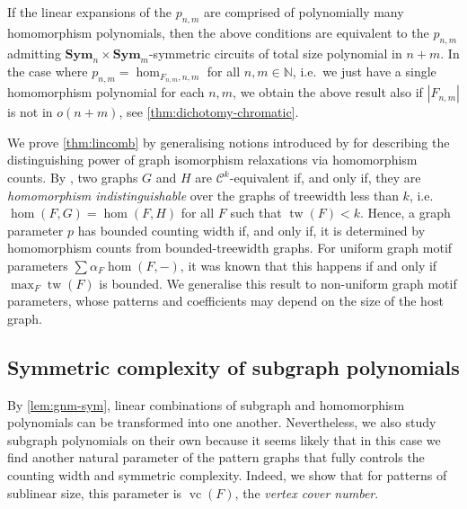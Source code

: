 \documentclass[10pt,a4paper]{article}
\theoremstyle{definition}
\theoremstyle{plain}
\theoremstyle{remark}
\DeclareMathOperator{\tw}{tw}
\DeclareMathOperator{\vc}{vc}
\newcommand{\Sym}{\mathbf{Sym}}
\newcommand{\bbN}{\mathbb{N}}
\begin{document}
If the linear expansions of the $p_{n,m}$ are comprised of polynomially many homomorphism polynomials,
then the above conditions are equivalent to   the $p_{n,m}$ admitting $\Sym_n\times \Sym_m$-symmetric circuits of total size polynomial in $n+m$.
In the case where $p_{n,m} = \hom_{F_{n,m}, n,m}$ for all $n,m \in \bbN$, i.e.\ we just have a single homomorphism polynomial for each $n,m$, we obtain the above result also if $|F_{n,m}|$ is not in $o(n+m)$, see \cref{thm:dichotomy-chromatic}.


We prove \cref{thm:lincomb} by generalising notions introduced by \textcite{roberson_oddomorphisms_2022} for describing the distinguishing power of graph isomorphism relaxations via homomorphism counts. 
By \cite{dvorak_recognizing_2010,dell-grohe-rattan},
two graphs $G$ and $H$ are $\mathcal{C}^k$-equivalent if, and only if, they are \emph{homomorphism indistinguishable} over the graphs of treewidth less than $k$, i.e.\ $\hom(F,G) = \hom(F, H)$ for all $F$ such that $\tw(F) < k$.
Hence, a graph parameter $p$ has bounded counting width if, and only if, it is determined by homomorphism counts from bounded-treewidth graphs.
For uniform graph motif parameters $\sum \alpha_F \hom(F, -)$, it was known \cite{seppelt_logical_2024,neuen_homomorphism-distinguishing_2024,lanzinger2024on} that this happens if and only if $\max_F \tw(F)$ is bounded.
We generalise this result to non-uniform graph motif parameters, whose patterns and coefficients may depend on the size of the host graph.

	
\subsection{Symmetric complexity of subgraph polynomials}	
By \cref{lem:gnm-sym}, linear combinations of subgraph and homomorphism polynomials can be transformed into one another. Nevertheless, we also study subgraph polynomials on their own because it seems likely that in this case we find another natural parameter of the pattern graphs that fully controls the counting width and symmetric complexity. Indeed, we show that for patterns of sublinear size, this parameter is $\vc(F)$, the \emph{vertex cover number}. 
\end{document}
